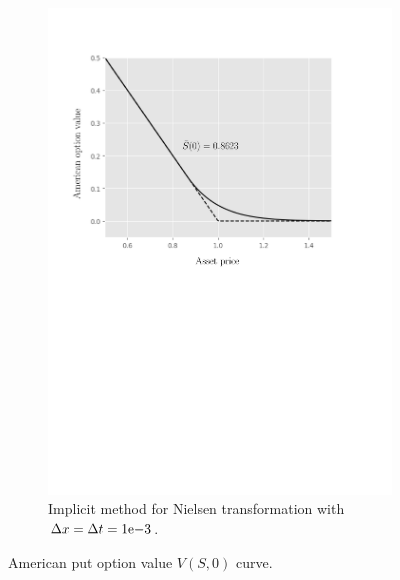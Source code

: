 \begin{figure}[H]
\begin{subfigure}{0.4\textwidth}
    \includegraphics[width=\textwidth]{chapters/chapter3/TestCase2NielsenExplicit.pdf}
    \caption{Implicit method for Nielsen transformation with $\Delta{x}=\Delta{t}={1}\mathrm{e}{-3}$.}
  \end{subfigure}
  \caption{American put option value $V(S, 0)$ curve.}
  \label{fig:finitedifferencesschemes:numericaresults:test_case_2_implicit}
\end{figure}

